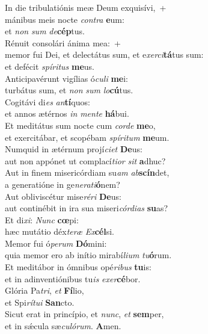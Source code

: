 \evenverse In die tribulatiónis meæ Deum exquisívi,~+\\\evenverse  mánibus meis nocte \textit{con}\textit{tra} \textbf{e}um:~\*\\
\evenverse et \textit{non} \textit{sum} \textit{de}\textbf{cép}tus.\\
\oddverse Rénuit consolári ánima mea:~+\\
\oddverse  memor fui Dei, et delectátus sum, et e\textit{xer}\textit{ci}\textbf{tá}tus sum:~\*\\
\oddverse et defécit \textit{spí}\textit{ri}\textit{tus} \textbf{me}us.\\
\evenverse Anticipavérunt vigílias ó\textit{cu}\textit{li} \textbf{me}i:~\*\\
\evenverse turbátus sum, et \textit{non} \textit{sum} \textit{lo}\textbf{cú}tus.\\
\oddverse Cogitávi di\textit{es} \textit{an}\textbf{tí}quos:~\*\\
\oddverse et annos ætérnos \textit{in} \textit{men}\textit{te} \textbf{há}bui.\\
\evenverse Et meditátus sum nocte cum \textit{cor}\textit{de} \textbf{me}o,~\*\\
\evenverse et exercitábar, et scopébam \textit{spí}\textit{ri}\textit{tum} \textbf{me}um.\\
\oddverse Numquid in ætérnum projí\textit{ci}\textit{et} \textbf{De}us:~\*\\
\oddverse aut non appónet ut complací\textit{ti}\textit{or} \textit{sit} \textbf{a}dhuc?\\
\evenverse Aut in finem misericórdiam su\textit{am} \textit{ab}\textbf{scín}det,~\*\\
\evenverse a generatióne in ge\textit{ne}\textit{ra}\textit{ti}\textbf{ó}nem?\\
\oddverse Aut obliviscétur mise\textit{ré}\textit{ri} \textbf{De}us:~\*\\
\oddverse aut continébit in ira sua miseri\textit{cór}\textit{di}\textit{as} \textbf{su}as?\\
\evenverse Et di\textit{xi}: \textit{Nunc} \textbf{cœ}pi:~\*\\
\evenverse hæc mutátio déx\textit{te}\textit{ræ} \textit{Ex}\textbf{cél}si.\\
\oddverse Memor fui ó\textit{pe}\textit{rum} \textbf{Dó}mini:~\*\\
\oddverse quia memor ero ab inítio mirabí\textit{li}\textit{um} \textit{tu}\textbf{ó}rum.\\
\evenverse Et meditábor in ómnibus opé\textit{ri}\textit{bus} \textbf{tu}is:~\*\\
\evenverse et in adinventiónibus tu\textit{is} \textit{e}\textit{xer}\textbf{cé}bor.\\
\oddverse Glória Pa\textit{tri}, \textit{et} \textbf{Fí}lio,~\*\\
\oddverse et Spi\textit{rí}\textit{tu}\textit{i} \textbf{San}cto.\\
\evenverse Sicut erat in princípio, et \textit{nunc}, \textit{et} \textbf{sem}per,~\*\\
\evenverse et in sǽcula sæ\textit{cu}\textit{ló}\textit{rum}. \textbf{A}men.\\
